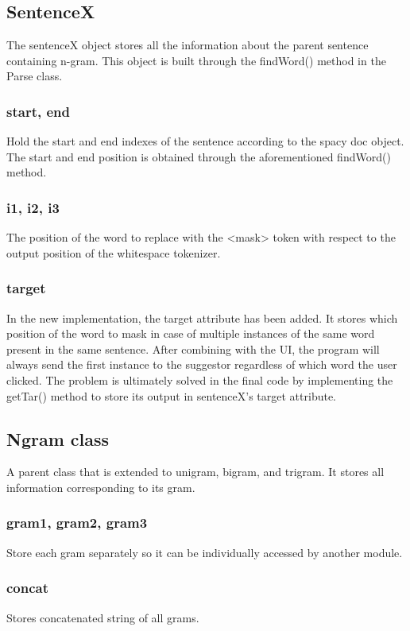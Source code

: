 \documentclass[12pt,oneside,openright,a4paper]{cpe-english-project}
\begin{document}
\subsection{SentenceX}
The sentenceX object stores all the information about the parent sentence containing n-gram. This object is built through the findWord() method in the Parse class. 

\subsubsection{ start, end }
Hold the start and end indexes of the sentence according to the spacy doc object. The start and end position is obtained through the aforementioned findWord() method. 


\subsubsection{ i1, i2, i3 }
The position of the word to replace with the <mask> token with respect to the output position of the whitespace tokenizer. 

\subsubsection{ target}
In the new implementation, the target attribute has been added. It stores which position of the word to mask in case of multiple instances of the same word present in the same sentence. After combining with the UI, the program will always send the first instance to the suggestor regardless of which word the user clicked. The problem is ultimately solved in the final code by implementing the getTar() method to store its output in sentenceX’s target attribute.

\subsection{Ngram class}
A parent class that is extended to unigram, bigram, and trigram. It stores all information corresponding to its gram.

\subsubsection{gram1, gram2, gram3}
Store each gram separately so it can be individually accessed by another module.

\subsubsection{concat}
Stores concatenated string of all grams. 
\end{document}
